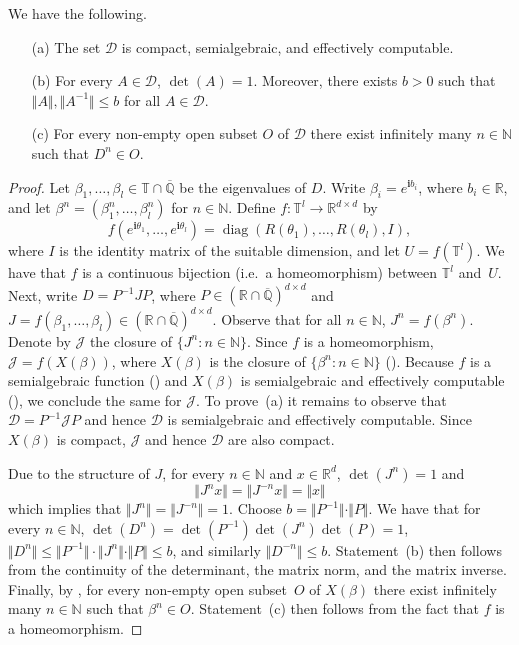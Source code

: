 \documentclass[a4paper,UKenglish,cleveref]{lipics-v2021}
\newcommand{\torus}{\mathbb{T}}
\newcommand{\nat}{\mathbb{N}}
\newcommand{\rel}{\mathbb{R}}
\newcommand{\rat}{\mathbb{Q}}
\newcommand{\alg}{\overline{\rat}}
\newcommand{\ralg}{\rel \cap \alg}
\newcommand{\diag}{\operatorname{diag}}
\newcommand{\Dcal}{\mathcal{D}}
\newcommand{\Jcal}{\mathcal{J}}
\newcommand{\im}{\bm{i}}
\begin{document}
\begin{lemma}
	\label{thm:rotation-matrix-closure}
	We have the following.
	\begin{itemize}
		\item[(a)] The set $\Dcal$ is compact, semialgebraic, and effectively computable.
		\item[(b)] For every $A \in \Dcal$, $\det(A) = 1$.
		Moreover, there exists $b >0$ such that $\Vert A \Vert, \Vert A^{-1} \Vert \le b$ for all $A \in \Dcal$.
		\item[(c)] For every non-empty open subset $O$ of $\Dcal$ there exist infinitely many $n \in\nat$ such that $D^n \in O$.
	\end{itemize}
\end{lemma}
\begin{proof}
	Let $\beta_1,\ldots,\beta_l \in \torus \cap \alg$ be the eigenvalues of $D$. Write $\beta_i = e^{\im b_i}$, where $b_i \in\rel$, and let $\beta^n = (\beta_1^n,\ldots,\beta_l^n)$ for $n \in \nat$.
	Define $f \colon \torus^l \to \rel^{d\times d}$ by
	\[
	f(e^{\im \theta_1},\ldots,e^{\im \theta_l}) = \diag(R(\theta_1),\ldots,R(\theta_l), I),
	\]
	where $I$ is the identity matrix of the suitable dimension, and let $U = f(\torus^l)$.
	We have that $f$ is a continuous bijection (i.e.\ a homeomorphism) between $\torus^l$ and~$U$.
	Next, write $D = P^{-1} J P$, where $P \in (\ralg)^{d\times d}$ and $J = f(\beta_1,\ldots,\beta_l) \in (\ralg)^{d\times d}$.
	Observe that for all $n \in \nat$, $J^n = f(\beta^n)$.
	Denote by $\Jcal$ the closure of $\{J^n \colon n \in \nat\}$.
	Since $f$ is a homeomorphism, $\Jcal = f(X(\beta))$, where $X(\beta)$ is the closure of $\{\beta^n \colon n \in \nat\}$ ().
	Because $f$ is a semialgebraic function () and $X(\beta)$ is semialgebraic and effectively computable (), we conclude the same for $\Jcal$.
	To prove~(a) it remains to observe that $\Dcal = P^{-1} \Jcal P$ and hence $\Dcal$ is semialgebraic and effectively computable.
	Since $X(\beta)$ is compact, $\Jcal$ and hence $\Dcal$ are also compact.
	
	Due to the structure of $J$, for every $n \in \nat$ and $x \in \rel^d$, $\det(J^n) = 1$ and 
	\[
	\bigl\Vert J^n x \bigr\Vert = \bigl\Vert J^{-n} x \bigr\Vert = \Vert x \Vert
	\] which implies that $\bigl\Vert J^n \bigr\Vert = \bigl\Vert J^{-n} \bigr\Vert = 1$.
	Choose $b = \Vert P^{-1} \Vert \cdot \Vert P \Vert$.
	We have that for every $n \in \nat$,
	$\det(D^n) = \det(P^{-1})  \det(J^n) \det(P) = 1$,  
	$\bigl\Vert  D^n \bigr\Vert   \le \Vert P^{-1} \Vert\cdot  \bigl\Vert  J^n \bigr\Vert \cdot  \Vert P \Vert \le b$, and similarly $\bigl\Vert  D^{-n} \bigr\Vert \le b$.
	Statement~(b) then follows from the continuity of the determinant, the matrix norm, and the matrix inverse.
	Finally, by , for every non-empty open subset~$O$ of $X(\beta)$ there exist infinitely many $n \in \nat$ such that $\beta^n \in O$.\@
	Statement~(c) then follows from the fact that $f$ is a homeomorphism.
\end{proof}
\end{document}
